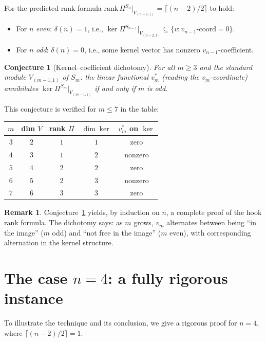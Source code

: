 \documentclass[11pt]{article}
\newtheorem{conjecture}[theorem]{Conjecture}
\theoremstyle{definition}
\newtheorem{remark}[theorem]{Remark}
\begin{document}
For the predicted rank formula
$\mathrm{rank}\,\Pi^{S_n}|_{V_{(n-1,1)}}=\lceil(n-2)/2\rceil$ to hold:
\begin{itemize}[topsep=0.3em,itemsep=0.2em,leftmargin=2em]
\item For $n$ \emph{even}: $\delta(n)=1$, i.e., $\ker\Pi^{S_{n-1}}|_{V_{(n-2,1)}}\subseteq\{v:v_{n-1}\text{-coord}=0\}$.
\item For $n$ \emph{odd}: $\delta(n)=0$, i.e., some kernel vector has nonzero
  $v_{n-1}$-coefficient.
\end{itemize}

\begin{conjecture}[Kernel--coefficient dichotomy]\label{conj:kernel}
For all $m\ge 3$ and the standard module $V_{(m-1,1)}$ of $S_m$:
the linear functional $v_m^*$ (reading the $v_m$-coordinate)
annihilates $\ker\Pi^{S_m}|_{V_{(m-1,1)}}$ if and only if $m$ is odd.
\end{conjecture}

This conjecture is verified for $m\le 7$ in the table:
\begin{center}
\begin{tabular}{c c c c c}
\toprule
$m$ & dim $V$ & rank $\Pi$ & $\dim\ker$ & $v_m^*$ on $\ker$ \\
\midrule
$3$ & $2$ & $1$ & $1$ & zero \\
$4$ & $3$ & $1$ & $2$ & nonzero \\
$5$ & $4$ & $2$ & $2$ & zero \\
$6$ & $5$ & $2$ & $3$ & nonzero \\
$7$ & $6$ & $3$ & $3$ & zero \\
\bottomrule
\end{tabular}
\end{center}

\begin{remark}\label{rem:dichotomy}
Conjecture~\ref{conj:kernel} yields, by induction on $n$, a complete
proof of the hook rank formula. The dichotomy says: as $m$ grows,
$v_m$ alternates between being ``in the image'' ($m$ odd) and
``not free in the image'' ($m$ even), with corresponding alternation
in the kernel structure.
\end{remark}

\section{The case $n=4$: a fully rigorous instance}\label{sec:n4}

To illustrate the technique and its conclusion, we give a rigorous
proof for $n=4$, where $\lceil(n-2)/2\rceil=1$.
\end{document}
